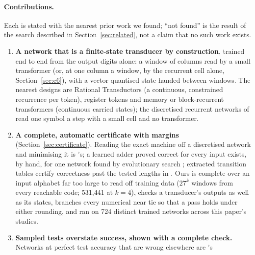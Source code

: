 \documentclass[11pt]{article}
\begin{document}
\paragraph{Contributions.} Each is stated with the nearest prior work we found; ``not found'' is the
result of the search described in Section~\ref{sec:related}, not a claim that no such work exists.
\begin{enumerate}
\item \textbf{A network that is a finite-state transducer by construction}, trained end to end
  from the output digits alone: a window of columns read by a small transformer (or, at one column a
  window, by the recurrent cell alone, Section~\ref{sec:e6}), with a vector-quantised state handed
  between windows. The nearest designs are Rational Transductors
  \citep{mohri-2026-rational-transductors} (a continuous, constrained recurrence per token),
  register tokens \citep{ge-2026-register-tokens-bounded-state-reasoning} and memory or
  block-recurrent transformers \citep{bulatov-2022-recurrent-memory-transformer,hutchins-2022-block-recurrent-transformers}
  (continuous carried states); the discretised recurrent networks of
  \citep{zeng-1993-self-clustering-recurrent-networks,das-1993-unified-gradient-clustering-fsm-induction,wang-2019-state-regularized-rnns,oliva-2020-dual-recurrent-memory-processing}
  read one symbol a step with a small cell and no transformer.
\item \textbf{A complete, automatic certificate with margins} (Section~\ref{sec:certificate}).
  Reading the exact machine off a discretised network and minimising it is
  \citeauthor{zeng-1993-self-clustering-recurrent-networks}'s; a learned adder proved correct for
  every input exists, by hand, for one network found by evolutionary search
  \citep{lan-2022-minimum-description-length-rnns}; extracted transition tables certify correctness
  past the tested lengths in \citet{brandoit-2026-length-independent-state-tracking}. Ours is
  complete over an input alphabet far too large to read off training data ($27^k$ windows from every
  reachable code; 531{,}441 at $k=4$), checks a transducer's outputs as well as its states,
  branches every numerical near tie so that a pass holds under either rounding, and ran on
  724 distinct trained networks across this paper's studies.
\item \textbf{Sampled tests overstate success, shown with a complete check.} Networks at perfect
  test accuracy that are wrong elsewhere are \citet{weiss-2018-extracting-automata-queries-counterexamples}'s

\end{enumerate}
\end{document}
